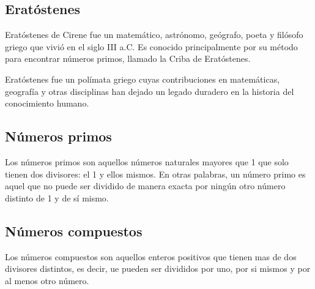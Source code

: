 \subsection{Eratóstenes}
Eratóstenes de Cirene fue un matemático, astrónomo, geógrafo, poeta y filósofo griego que vivió en el siglo III a.C. Es conocido principalmente por su método para encontrar números primos, llamado la Criba de Eratóstenes.

Eratóstenes fue un polímata griego cuyas contribuciones en matemáticas, geografía y otras disciplinas han dejado un legado duradero en la historia del conocimiento humano.

\subsection{Números primos}

Los números primos son aquellos números naturales mayores que 1 que solo tienen dos divisores: el 1 y ellos mismos. En otras palabras, un número primo es aquel que no puede ser dividido de manera exacta por ningún otro número distinto de 1 y de sí mismo.

\subsection{Números compuestos}
Los números compuestos son aquellos enteros positivos que tienen mas de dos divisores distintos, es decir, ue pueden ser divididos por uno, por si mismos y por al menos otro número.
